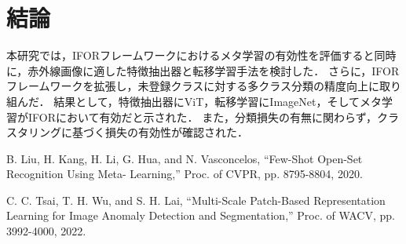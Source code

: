\documentclass[uplatex,dvipdfmx,10pt,twocolumn]{jsarticle}
\begin{document}
\section{結論}

本研究では，IFORフレームワークにおけるメタ学習の有効性を評価すると同時に，赤外線画像に適した特徴抽出器と転移学習手法を検討した．
さらに，IFOR フレームワークを拡張し，未登録クラスに対する多クラス分類の精度向上に取り組んだ．
結果として，特徴抽出器にViT，転移学習にImageNet，そしてメタ学習がIFORにおいて有効だと示された．
また，分類損失の有無に関わらず，クラスタリングに基づく損失の有効性が確認された．

\begin{thebibliography}{9}
B. Liu, H. Kang, H. Li, G. Hua, and N. Vasconcelos, 
``Few-Shot Open-Set Recognition Using Meta- Learning,'' 
Proc. of CVPR, pp. 8795-8804, 2020.

C. C. Tsai, T. H. Wu, and S. H. Lai, 
``Multi-Scale Patch-Based Representation Learning for Image Anomaly Detection and Segmentation,'' 
Proc. of WACV, pp. 3992-4000, 2022.
\end{thebibliography}
\end{document}
